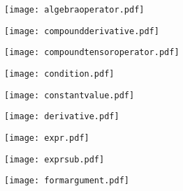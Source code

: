 \documentclass{beamer}
\begin{document}
\begin{frame}
\begin{figure}\texttt{[image: algebraoperator.pdf]}\end{figure}
\end{frame}

\begin{frame}
\begin{figure}\texttt{[image: compoundderivative.pdf]}\end{figure}
\end{frame}

\begin{frame}
\begin{figure}\texttt{[image: compoundtensoroperator.pdf]}\end{figure}
\end{frame}

\begin{frame}
\begin{figure}\texttt{[image: condition.pdf]}\end{figure}
\end{frame}

\begin{frame}
\begin{figure}\texttt{[image: constantvalue.pdf]}\end{figure}
\end{frame}

\begin{frame}
\begin{figure}\texttt{[image: derivative.pdf]}\end{figure}
\end{frame}

\begin{frame}
\begin{figure}\texttt{[image: expr.pdf]}\end{figure}
\end{frame}

\begin{frame}
\begin{figure}\texttt{[image: exprsub.pdf]}\end{figure}
\end{frame}

\begin{frame}
\begin{figure}\texttt{[image: formargument.pdf]}\end{figure}
\end{frame}
\end{document}
